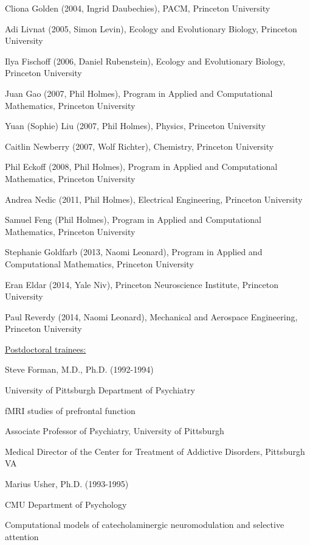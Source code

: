 \documentclass[10 pt]{article}
\begin{document}
Cliona Golden (2004, Ingrid Daubechies), PACM, Princeton University
    \smallskip

Adi Livnat (2005, Simon Levin), Ecology and Evolutionary Biology, Princeton University
    \smallskip

Ilya Fischoff (2006, Daniel Rubenstein), Ecology and Evolutionary Biology, Princeton University
    \smallskip

Juan Gao (2007, Phil Holmes), Program in Applied and Computational Mathematics, Princeton University
    \smallskip

Yuan (Sophie) Liu (2007, Phil Holmes), Physics, Princeton University
    \smallskip

Caitlin Newberry (2007, Wolf Richter), Chemistry, Princeton University
    \smallskip

Phil Eckoff (2008, Phil Holmes), Program in Applied and Computational Mathematics, Princeton University

Andrea Nedic (2011, Phil Holmes), Electrical Engineering, Princeton University
    \smallskip

Samuel Feng (Phil Holmes), Program in Applied and Computational Mathematics, Princeton University
    \smallskip

Stephanie Goldfarb (2013, Naomi Leonard), Program in Applied and Computational Mathematics, Princeton University
    \smallskip

Eran Eldar (2014, Yale Niv), Princeton Neuroscience Institute, Princeton University
    \smallskip

Paul Reverdy (2014, Naomi Leonard), Mechanical and Aerospace Engineering, Princeton University
    \bigskip


{\fontsize{13pt}{16 pt}\selectfont \underline{Postdoctoral trainees:}}
    \smallskip

Steve Forman, M.D., Ph.D. (1992-1994)

University of Pittsburgh Department of Psychiatry

fMRI studies of prefrontal function

Associate Professor of Psychiatry, University of Pittsburgh

Medical Director of the Center for Treatment of Addictive Disorders, Pittsburgh VA
    \medskip

Marius Usher, Ph.D. (1993-1995)

CMU Department of Psychology

Computational models of catecholaminergic neuromodulation and selective attention
\end{document}
